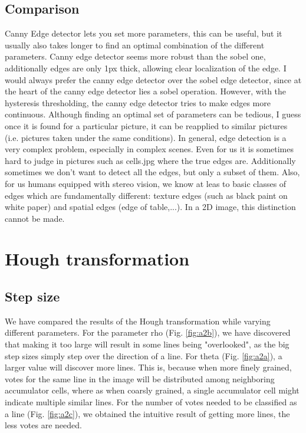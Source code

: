 \documentclass[11pt,a4paper]{article}
\begin{document}
\subsection{Comparison}


Canny Edge detector lets you set more parameters, this can be useful, but it usually also takes longer to find an optimal combination of the different parameters. Canny edge detector seems more robust than the sobel one, additionally edges are only 1px thick, allowing clear localization of the edge.  I would always prefer the canny edge detector over the sobel edge detector, since at the heart of the canny edge detector lies a sobel operation. However, with the hysteresis thresholding, the canny edge detector tries to make edges more continuous. Although finding an optimal set of parameters can be tedious, I guess once it is found for a particular picture, it can be reapplied to similar pictures (i.e. pictures taken under the same conditions).  In general, edge detection is a very complex problem, especially in complex scenes. Even for us it is sometimes hard to judge in pictures such as cells.jpg where the true edges are. Additionally sometimes we don't want to detect all the edges, but only a subset of them. Also, for us humans equipped with stereo vision, we know at leas to basic classes of edges which are fundamentally different: texture edges (such as black paint on white paper) and spatial edges (edge of table,...). In a 2D image, this distinction cannot be made.



\FloatBarrier

\section{Hough transformation}
\subsection{Step size}
We have compared the results of the Hough transformation while varying different parameters.
For the parameter rho (Fig. \ref{fig:a2b}), we have discovered that making it too large will result in some lines being "overlooked", as the big step sizes simply step over the direction of a line. For theta (Fig. \ref{fig:a2a}), a larger value will discover more lines. This is, because when more finely grained, votes for the same line in the image will be distributed among neighboring accumulator cells, where as when coarsly grained, a single accumulator cell might indicate multiple similar lines. For the number of votes needed to be classified as a line (Fig. \ref{fig:a2c}), we obtained the intuitive result of getting more lines, the less votes are needed.
\end{document}
